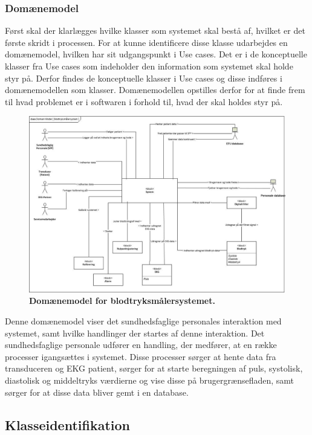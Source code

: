 \subsubsection{Domænemodel}
Først skal der klarlægges hvilke klasser som systemet skal bestå af, hvilket er det første skridt i processen. For at kunne identificere disse klasse udarbejdes en domænemodel, hvilken har sit udgangspunkt i Use cases. Det er i de konceptuelle klasser fra Use cases som indeholder den information som systemet skal holde styr på. Derfor findes de konceptuelle klasser i Use cases og disse indføres i domænemodellen som klasser. Domænemodellen opstilles derfor for at finde frem til hvad problemet er i softwaren i forhold til, hvad der skal holdes styr på.
\begin{figure}[H]
\includegraphics[width =1.0\textwidth , center]{billeder/DM}
\caption{\textbf{Domænemodel for blodtryksmålersystemet.}}
\end{figure}
Denne domænemodel viser det sundhedsfaglige personales interaktion med systemet, samt hvilke handlinger der startes af denne interaktion. Det sundhedsfaglige personale udfører en handling, der medfører, at en række processer igangsættes i systemet. Disse processer sørger at hente data fra transduceren og EKG patient, sørger for at starte beregningen af puls, systolisk, diastolisk og middeltryks værdierne og vise disse på brugergrænsefladen, samt sørger for at disse data bliver gemt i en database.
\newpage
\subsection{Klasseidentifikation}
